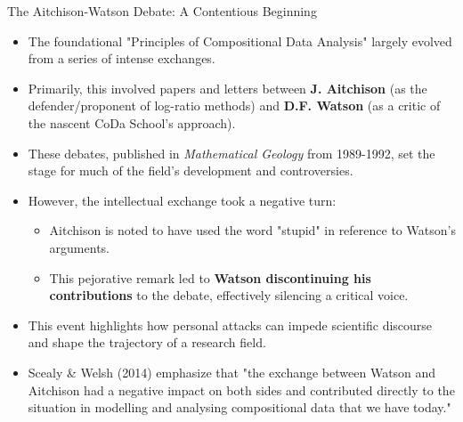 \begin{frame}{The Aitchison-Watson Debate: A Contentious Beginning}
\scriptsize   %

    \begin{itemize}
        \item The foundational "Principles of Compositional Data Analysis" largely evolved from a series of intense exchanges.
        \item Primarily, this involved papers and letters between \textbf{J. Aitchison} (as the defender/proponent of log-ratio methods) and \textbf{D.F. Watson} (as a critic of the nascent CoDa School's approach).
        \item These debates, published in \textit{Mathematical Geology} from 1989-1992, set the stage for much of the field's development and controversies.
        \item However, the intellectual exchange took a negative turn:
        \begin{itemize}
            \item Aitchison is noted to have used the word "stupid" in reference to Watson's arguments.
            \item This pejorative remark led to \textbf{Watson discontinuing his contributions} to the debate, effectively silencing a critical voice.
        \end{itemize}
        \item This event highlights how personal attacks can impede scientific discourse and shape the trajectory of a research field.
        \item Scealy & Welsh (2014) emphasize that "the exchange between Watson and Aitchison had a negative impact on both sides and contributed directly to the situation in modelling and analysing compositional data that we have today."
    \end{itemize}
\end{frame}
